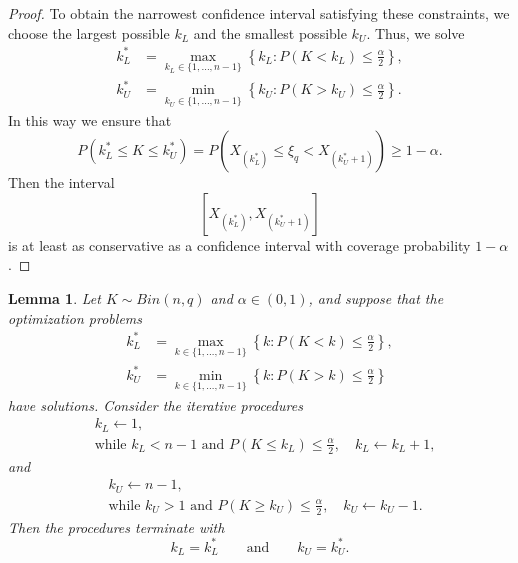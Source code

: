\documentclass{article}
\newtheorem{lemma}{Lemma}
\begin{document}
\begin{proof}
To obtain the narrowest confidence interval satisfying these constraints, we choose the largest possible $k_L$ and the smallest possible $k_U$. Thus, we solve
$$
\begin{aligned}
k_L^*
&=
\max_{k_L\in\{1,\ldots,n-1\}}
\left\{
k_L:
P(K<k_L)\leq\frac{\alpha}{2}
\right\},\\
k_U^*
&=
\min_{k_U\in\{1,\ldots,n-1\}}
\left\{
k_U:
P(K>k_U)\leq\frac{\alpha}{2}
\right\}.
\end{aligned}
$$
In this way we ensure that
$$P(k_L^*\leq K \leq k_U^*)=P(X_{(k_L^*)}\leq \xi_q< X_{(k_U^*+1)})\geq 1-\alpha.$$
Then the interval
$$[X_{(k_L^*)},X_{(k_U^*+1)}]$$
is at least as conservative as a confidence interval with coverage probability $1-\alpha$.
\end{proof}

\begin{lemma}
Let $K\sim Bin(n,q)$ and $\alpha\in(0,1)$, and suppose that the optimization problems
$$
\begin{aligned}
k_L^*
&=
\max_{k\in\{1,\ldots,n-1\}}
\left\{
k:
P(K<k)\leq\frac{\alpha}{2}
\right\},\\
k_U^*
&=
\min_{k\in\{1,\ldots,n-1\}}
\left\{
k:
P(K>k)\leq\frac{\alpha}{2}
\right\}
\end{aligned}
$$
have solutions. Consider the iterative procedures
$$
\begin{aligned}
&k_L\leftarrow 1,\\
&\text{while } k_L<n-1
\text{ and }
P(K\leq k_L)\leq\frac{\alpha}{2},
\quad
k_L\leftarrow k_L+1,
\end{aligned}
$$
and
$$
\begin{aligned}
&k_U\leftarrow n-1,\\
&\text{while } k_U>1
\text{ and }
P(K\geq k_U)\leq\frac{\alpha}{2},
\quad
k_U\leftarrow k_U-1.
\end{aligned}
$$
Then the procedures terminate with
$$
k_L=k_L^*
\qquad\text{and}\qquad
k_U=k_U^*.
$$
\end{lemma}
\end{document}
